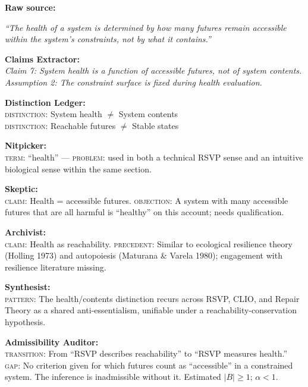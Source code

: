 \documentclass[12pt, a4paper]{article}
\theoremstyle{principle}
\theoremstyle{definition}
\begin{document}
\begin{tracebox}
\noindent\textbf{Raw source:}

\smallskip
\textit{``The health of a system is determined by how many futures remain
accessible within the system's constraints, not by what it contains.''}

\bigskip
\noindent\textbf{Claims Extractor:}\\
\textit{Claim 7: System health is a function of accessible futures, not of
system contents.}\\
\textit{Assumption 2: The constraint surface is fixed during health evaluation.}

\bigskip
\noindent\textbf{Distinction Ledger:}\\
\textsc{distinction}: System health $\neq$ System contents\\
\textsc{distinction}: Reachable futures $\neq$ Stable states

\bigskip
\noindent\textbf{Nitpicker:}\\
\textsc{term}: ``health'' --- \textsc{problem}: used in both a technical RSVP
sense and an intuitive biological sense within the same section.

\bigskip
\noindent\textbf{Skeptic:}\\
\textsc{claim}: Health = accessible futures.
\textsc{objection}: A system with many accessible futures that are all harmful
is ``healthy'' on this account; needs qualification.

\bigskip
\noindent\textbf{Archivist:}\\
\textsc{claim}: Health as reachability.
\textsc{precedent}: Similar to ecological resilience theory (Holling 1973) and
autopoiesis (Maturana \& Varela 1980); engagement with resilience literature missing.

\bigskip
\noindent\textbf{Synthesist:}\\
\textsc{pattern}: The health/contents distinction recurs across RSVP, CLIO, and
Repair Theory as a shared anti-essentialism, unifiable under a
reachability-conservation hypothesis.

\bigskip
\noindent\textbf{Admissibility Auditor:}\\
\textsc{transition}: From ``RSVP describes reachability'' to
``RSVP measures health.''\\
\textsc{gap}: No criterion given for which futures count as ``accessible'' in a
constrained system. The inference is inadmissible without it. Estimated $|B| \geq 1$;
$\alpha < 1$.
\end{tracebox}
\end{document}
